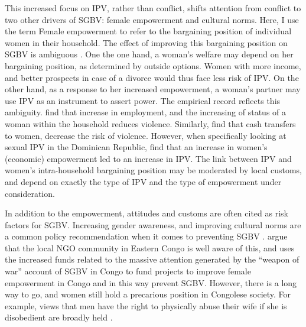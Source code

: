 \documentclass[10pt,a4paper,abstract=on]{scrartcl} %
\begin{document}
This increased focus on IPV, rather than conflict, shifts attention from conflict to two other drivers of SGBV: female empowerment and cultural norms. Here, I use the term Female empowerment to refer to the bargaining position of individual women in their household. The effect of improving this bargaining position on SGBV is ambiguous \citep{Eswaran2011}. One the one hand, a woman's welfare may depend on her bargaining position, as determined by outside options. Women with more income, and better prospects in case of a divorce would thus face less risk of IPV. On the other hand, as a response to her increased empowerment, a  woman's partner may use IPV as an instrument to assert power. The empirical record reflects this ambiguity. \cite{Bhattacharya} find that increase in employment, and the increasing of status of a woman within the household reduces violence. Similarly, \cite{Hidrobo2016} find that cash transfers to women, decrease the risk of violence. However, when specifically looking at sexual IPV in the Dominican Republic, \cite{Bueno2017} find that an increase in women's (economic) empowerment led to an increase in IPV. The link between IPV and women's intra-household bargaining position may be moderated by local customs, and depend on exactly the type of IPV and the type of empowerment under consideration.

In addition to the empowerment, attitudes and customs are often cited as risk factors for SGBV. Increasing gender awareness, and improving cultural norms are a common policy recommendation when it comes to preventing SGBV \cite[e.g.][]{Quattrochi2019,Bueno2017}. \cite{Hilhorst2018} argue that the local NGO community in Eastern Congo is well aware of this, and uses the increased funds related to the massive attention generated by the ``weapon of war'' account of SGBV in Congo to fund projects to improve female empowerment in Congo and in this way prevent SGBV.  However, there is a long way to go, and women still hold a precarious position in Congolese society. For example, views that men have the right to physically abuse their wife if she is disobedient are broadly held \citep{Quattrochi2019}.
\end{document}
